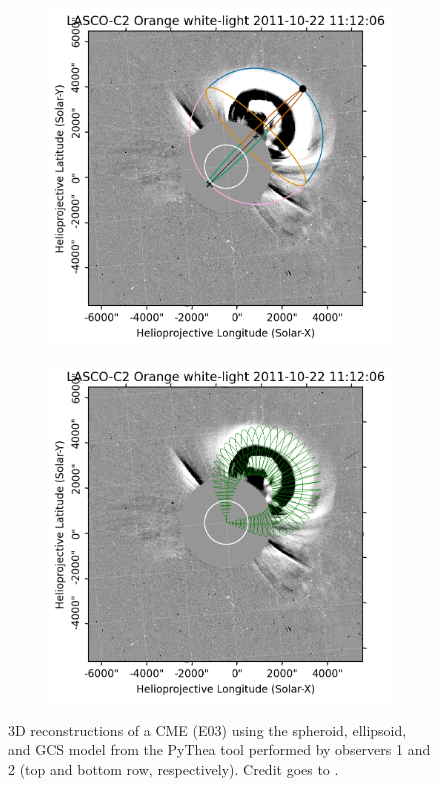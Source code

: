 \begin{figure}[!htp]
\begin{subfigure}[b]{0.3\textwidth}
	\end{subfigure}
	\hfill
	\begin{subfigure}[b]{0.3\textwidth}
		\includegraphics[width=\textwidth]{chapter2/figs/Fig_e2.png}
	\end{subfigure}
	\hfill
	\begin{subfigure}[b]{0.3\textwidth}
		\includegraphics[width=\textwidth]{chapter2/figs/Fig_g2.png}
	\end{subfigure}
	\caption{3D reconstructions of a CME (E03) using the spheroid, ellipsoid, and GCS model from the PyThea tool performed by observers 1 and 2 (top and bottom row, respectively). Credit goes to \citet{miteva_2023}.}
	\label{fig_3D_fit}
\end{figure}

